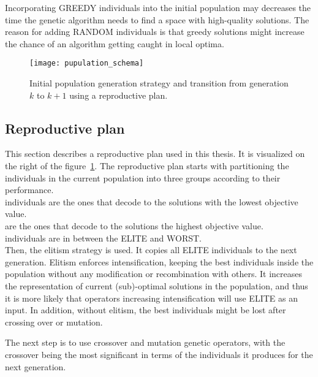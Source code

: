 Incorporating GREEDY individuals into the initial population may decreases the time the genetic algorithm needs to find a space with high-quality solutions.
The reason for adding RANDOM individuals is that greedy solutions might increase the chance
of an algorithm getting caught in local optima.

\begin{figure}[!h]
    \texttt{[image: pupulation\_schema]}
    \caption[Initial population generation strategy and transition]
    {Initial population generation strategy and transition from generation $k$ to $k+1$ using a reproductive plan.}
    \label{fig:population-schema}
\end{figure}


\newpage

\subsection{Reproductive plan}\label{subsec:reproductive-plan}
This section describes a reproductive plan used in this thesis.
It is visualized on the right of the figure~\ref{fig:population-schema}.
The reproductive plan starts with partitioning the individuals in the current
population into three groups according to their performance.\\

 individuals are the ones that decode to the solutions with the lowest objective value.\\

 are the ones that decode to the solutions the highest objective value.\\

 individuals are in between the ELITE and WORST.\\

Then, the elitism strategy is used.
It copies all ELITE individuals to the next generation.
Elitism enforces intensification, keeping the best individuals inside the population without any
modification or recombination with others.
It increases the representation of current (sub)-optimal solutions in the population, and thus it is
more likely that operators increasing intensification will use ELITE as an input.
In addition, without elitism, the best individuals might be lost after crossing over or mutation.

The next step is to use crossover and mutation genetic operators, with the crossover being
the most significant in terms of the individuals it produces for the next generation.\\

